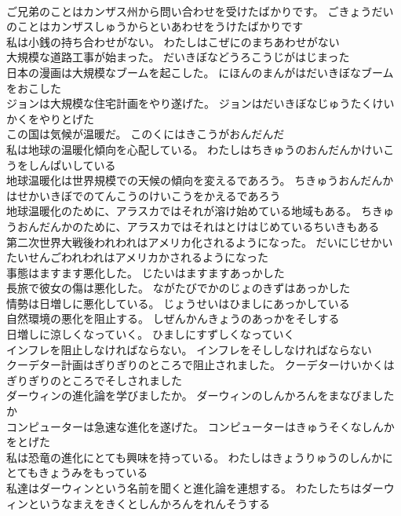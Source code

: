 \documentclass[8pt]{extreport}
\begin{document}
\begin{CJK}{UTF8}{min}
\\	ご兄弟のことはカンザス州から問い合わせを受けたばかりです。	ごきょうだいのことはカンザスしゅうからといあわせをうけたばかりです 
\\	私は小銭の持ち合わせがない。	わたしはこぜにのまちあわせがない 
\\	大規模な道路工事が始まった。	だいきぼなどうろこうじがはじまった 
\\	日本の漫画は大規模なブームを起こした。	にほんのまんがはだいきぼなブームをおこした 
\\	ジョンは大規模な住宅計画をやり遂げた。	ジョンはだいきぼなじゅうたくけいかくをやりとげた 
\\	この国は気候が温暖だ。	このくにはきこうがおんだんだ 
\\	私は地球の温暖化傾向を心配している。	わたしはちきゅうのおんだんかけいこうをしんぱいしている 
\\	地球温暖化は世界規模での天候の傾向を変えるであろう。	ちきゅうおんだんかはせかいきぼでのてんこうのけいこうをかえるであろう 
\\	地球温暖化のために、アラスカではそれが溶け始めている地域もある。	ちきゅうおんだんかのために、アラスカではそれはとけはじめているちいきもある 
\\	第二次世界大戦後われわれはアメリカ化されるようになった。	だいにじせかいたいせんごわれわれはアメリカかされるようになった 
\\	事態はますます悪化した。	じたいはますますあっかした 
\\	長旅で彼女の傷は悪化した。	ながたびでかのじょのきずはあっかした 
\\	情勢は日増しに悪化している。	じょうせいはひましにあっかしている 
\\	自然環境の悪化を阻止する。	しぜんかんきょうのあっかをそしする 
\\	日増しに涼しくなっていく。	ひましにすずしくなっていく 
\\	インフレを阻止しなければならない。	インフレをそししなければならない 
\\	クーデター計画はぎりぎりのところで阻止されました。	クーデターけいかくはぎりぎりのところでそしされました 
\\	ダーウィンの進化論を学びましたか。	ダーウィンのしんかろんをまなびましたか 
\\	コンピューターは急速な進化を遂げた。	コンピューターはきゅうそくなしんかをとげた 
\\	私は恐竜の進化にとても興味を持っている。	わたしはきょうりゅうのしんかにとてもきょうみをもっている 
\\	私達はダーウィンという名前を聞くと進化論を連想する。	わたしたちはダーウィンというなまえをきくとしんかろんをれんそうする 

\end{CJK}
\end{document}
